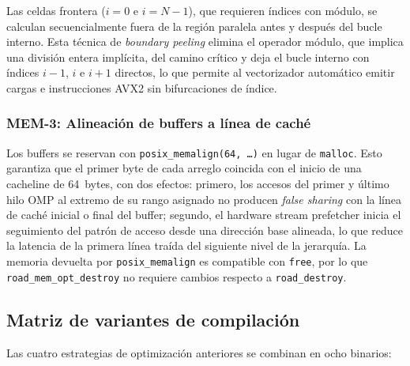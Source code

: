 Las celdas frontera ($i = 0$ e $i = N-1$), que requieren índices con
módulo, se calculan secuencialmente fuera de la región paralela antes y
después del bucle interno. Esta técnica de \emph{boundary peeling} elimina
el operador módulo, que implica una división entera implícita, del camino
crítico y deja el bucle interno con índices $i{-}1$, $i$ e $i{+}1$
directos, lo que permite al vectorizador automático emitir cargas e
instrucciones AVX2 sin bifurcaciones de índice.

\subsubsection{MEM-3: Alineación de buffers a línea de caché}

Los buffers se reservan con \texttt{posix\_memalign(64, \ldots)} en lugar
de \texttt{malloc}. Esto garantiza que el primer byte de cada arreglo
coincida con el inicio de una cacheline de 64~bytes, con dos efectos:
primero, los accesos del primer y último hilo OMP al extremo de su rango
asignado no producen \emph{false sharing} con la línea de caché inicial o
final del buffer; segundo, el hardware stream prefetcher inicia el
seguimiento del patrón de acceso desde una dirección base alineada, lo
que reduce la latencia de la primera línea traída del siguiente nivel de
la jerarquía. La memoria devuelta por \texttt{posix\_memalign} es
compatible con \texttt{free}, por lo que \texttt{road\_mem\_opt\_destroy}
no requiere cambios respecto a \texttt{road\_destroy}.

\subsection{Matriz de variantes de compilación}

Las cuatro estrategias de optimización anteriores se combinan en ocho
binarios:


